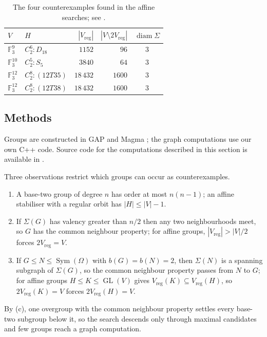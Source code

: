 \documentclass[a4paper,reqno,11pt]{amsart}
\newcommand\F{\mathbb{F}}
\newcommand\GL{\operatorname{GL}}
\newcommand\diam{\operatorname{diam}}
\newcommand\Symgrp{\operatorname{Sym}}
\numberwithin{equation}{section}
\begin{document}
\begin{table}[!htbp]
\centering
\begin{tabular}{llrrc}
\hline
$V$ & $H$ & $|V_{\mathrm{reg}}|$ &
$|V\setminus2V_{\mathrm{reg}}|$ & $\diam\Sigma$\\
\hline
$\F_3^{9}$  & $C_2^6{:}D_{18}$    & $1152$    & $96$   & $3$\\
$\F_3^{10}$ & $C_2^5{:}S_5$       & $3840$    & $64$   & $3$\\
$\F_3^{12}$ & $C_2^8{:}(12T35)$   & $18\,432$ & $1600$ & $3$\\
$\F_3^{12}$ & $C_2^8{:}(12T38)$   & $18\,432$ & $1600$ & $3$\\
\hline
\end{tabular}
\smallskip
\caption{The four counterexamples found in the affine searches; see \cite{AlunaAdam}.}
\label{tab:counterexamples}
\end{table}


\subsection{Methods}

Groups are constructed in GAP \cite{GAP} and Magma \cite{Magma}; the graph computations use our own C++ code. Source code for the computations described in this section is available in \cite{AlunaAdam}.

Three observations restrict which groups can occur as counterexamples.
\begin{enumerate}
\item[{(a)}] A base-two group of degree $n$ has order at most $n(n-1)$; an affine stabiliser with a regular orbit has $|H|\le|V|-1$.
\item[{(b)}] If $\Sigma(G)$ has valency greater than $n/2$ then any two neighbourhoods meet, so $G$ has the common neighbour property; for affine groups, $|V_{\mathrm{reg}}|>|V|/2$ forces $2V_{\mathrm{reg}}=V$.
\item[{(c)}] If $G\le N\le\Symgrp(\Omega)$ with $b(G)=b(N)=2$, then $\Sigma(N)$ is a spanning subgraph of $\Sigma(G)$, so the common neighbour property passes from $N$ to $G$; for affine groups $H\le K\le\GL(V)$ gives $V_{\mathrm{reg}}(K)\subseteq V_{\mathrm{reg}}(H)$, so $2V_{\mathrm{reg}}(K)=V$ forces $2V_{\mathrm{reg}}(H)=V$.
\end{enumerate}
By (c), one overgroup with the common neighbour property settles every base-two subgroup below it, so the search descends only through maximal candidates and few groups reach a graph computation.
\end{document}
